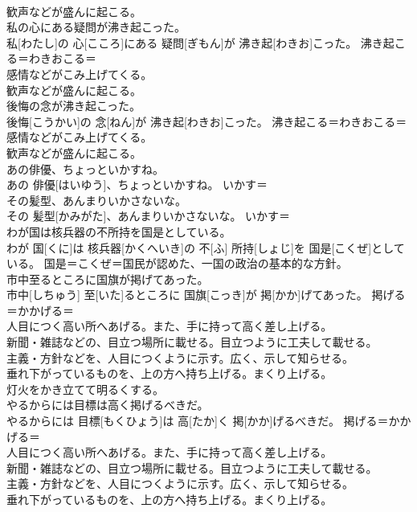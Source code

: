 \documentclass[8pt]{extreport}
\begin{document}
\begin{CJK}{UTF8}{min}
{\\	歓声などが盛んに起こる。
\\	私の心にある疑問が沸き起こった。	
\\	私[わたし]の 心[こころ]にある 疑問[ぎもん]が 沸き起[わきお]こった。	沸き起こる＝わきおこる＝ 
\\	感情などがこみ上げてくる。 
\\	歓声などが盛んに起こる。
\\	後悔の念が沸き起こった。	
\\	後悔[こうかい]の 念[ねん]が 沸き起[わきお]こった。	沸き起こる＝わきおこる＝ 
\\	感情などがこみ上げてくる。 
\\	歓声などが盛んに起こる。
\\	あの俳優、ちょっといかすね。	
\\	あの 俳優[はいゆう]、ちょっといかすね。	いかす＝ 
\\	その髪型、あんまりいかさないな。	
\\	その 髪型[かみがた]、あんまりいかさないな。	いかす＝ 
\\	わが国は核兵器の不所持を国是としている。	
\\	わが 国[くに]は 核兵器[かくへいき]の 不[ふ] 所持[しょじ]を 国是[こくぜ]としている。	国是＝こくぜ＝国民が認めた、一国の政治の基本的な方針。
\\	市中至るところに国旗が掲げてあった。	
\\	市中[しちゅう] 至[いた]るところに 国旗[こっき]が 掲[かか]げてあった。	掲げる＝かかげる＝ 
\\	人目につく高い所へあげる。また、手に持って高く差し上げる。 
\\	新聞・雑誌などの、目立つ場所に載せる。目立つように工夫して載せる。 
\\	主義・方針などを、人目につくように示す。広く、示して知らせる。 
\\	垂れ下がっているものを、上の方へ持ち上げる。まくり上げる。 
\\	灯火をかき立てて明るくする。
\\	やるからには目標は高く掲げるべきだ。	
\\	やるからには 目標[もくひょう]は 高[たか]く 掲[かか]げるべきだ。	掲げる＝かかげる＝ 
\\	人目につく高い所へあげる。また、手に持って高く差し上げる。 
\\	新聞・雑誌などの、目立つ場所に載せる。目立つように工夫して載せる。 
\\	主義・方針などを、人目につくように示す。広く、示して知らせる。 
\\	垂れ下がっているものを、上の方へ持ち上げる。まくり上げる。 
}
\end{CJK}
\end{document}

